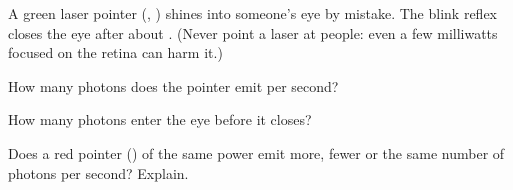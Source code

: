 A green laser pointer (\laO, \PlO) shines into someone's eye by mistake. The blink reflex closes the eye after about \tO. (Never point a laser at people: even a few milliwatts focused on the retina can harm it.)

\begin{abcliste}
\abc How many photons does the pointer emit per second?

\abc How many photons enter the eye before it closes?

\abc Does a red pointer (\lbO) of the same power emit more, fewer or the same number of photons per second? Explain.
\end{abcliste}
